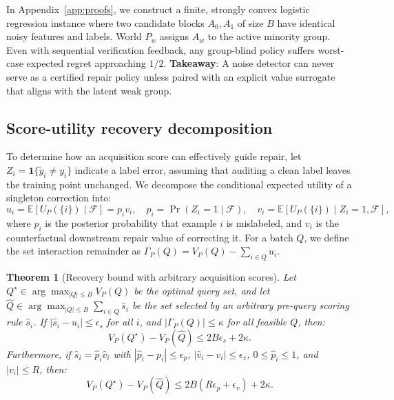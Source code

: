 \documentclass{article}
\newtheorem{theorem}{Theorem}
\begin{document}
In Appendix~\ref{app:proofs}, we construct a finite, strongly convex logistic regression instance where two candidate blocks $A_0, A_1$ of size $B$ have identical noisy features and labels. World $P_w$ assigns $A_w$ to the active minority group. Even with sequential verification feedback, any group-blind policy suffers worst-case expected regret approaching $1/2$.
\textbf{Takeaway}: A noise detector can never serve as a certified repair policy unless paired with an explicit value surrogate that aligns with the latent weak group.

\subsection{Score-utility recovery decomposition}
\label{sec:theory_decomp}

To determine how an acquisition score can effectively guide repair, let $Z_i = \mathbf 1\{\tilde y_i \ne y_i\}$ indicate a label error, assuming that auditing a clean label leaves the training point unchanged. We decompose the conditional expected utility of a singleton correction into:
\begin{equation}
  u_i = \mathbb E[U_P(\{i\})\mid\mathcal F] = p_i v_i,\quad
  p_i = \Pr(Z_i=1\mid\mathcal F),\quad
  v_i = \mathbb E[U_P(\{i\})\mid Z_i=1,\mathcal F],
  \label{eq:decomp}
\end{equation}
where $p_i$ is the posterior probability that example $i$ is mislabeled, and $v_i$ is the counterfactual downstream repair value of correcting it. For a batch $Q$, we define the set interaction remainder as $\Gamma_P(Q) = V_P(Q) - \sum_{i\in Q} u_i$.

\begin{theorem}[Recovery bound with arbitrary acquisition scores]
\label{thm:score-recovery}
Let $Q^\star\in\arg\max_{|Q|\leq B}V_P(Q)$ be the optimal query set, and let $\widehat Q\in\arg\max_{|Q|\leq B}\sum_{i\in Q}\hat s_i$ be the set selected by an arbitrary pre-query scoring rule $\hat s_i$. If $|\hat s_i-u_i|\leq\epsilon_s$ for all $i$, and $|\Gamma_P(Q)|\leq\kappa$ for all feasible $Q$, then:
\begin{equation}
  V_P(Q^\star)-V_P(\widehat Q)\leq 2B\epsilon_s+2\kappa.
\end{equation}
Furthermore, if $\hat s_i = \hat p_i \hat v_i$ with $|\hat p_i - p_i| \le \epsilon_p$, $|\hat v_i - v_i| \le \epsilon_v$, $0 \le \hat p_i \le 1$, and $|v_i| \le R$, then:
\begin{equation}
  V_P(Q^\star)-V_P(\widehat Q)\leq 2B(R\epsilon_p + \epsilon_v) + 2\kappa.
\end{equation}
\end{theorem}
\end{document}
